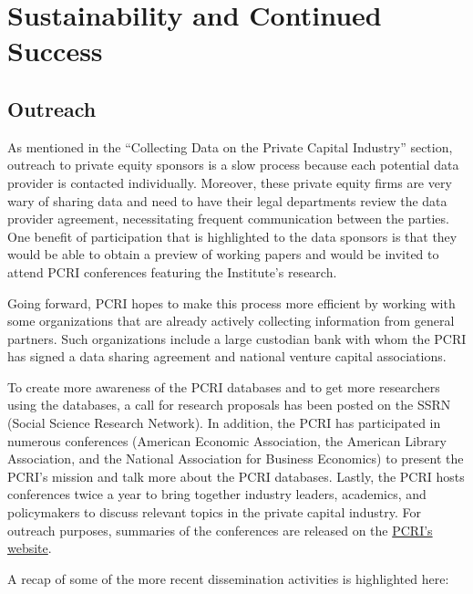 \hypertarget{sustainability-and-continued-success-2}{%
\section{Sustainability and Continued Success}\label{sustainability-and-continued-success-2}}

\hypertarget{outreach-2}{%
\subsection{Outreach}\label{outreach-2}}

As mentioned in the ``Collecting Data on the Private Capital Industry'' section, outreach to private equity sponsors is a slow process because each potential data provider is contacted individually. Moreover, these private equity firms are very wary of sharing data and need to have their legal departments review the data provider agreement, necessitating frequent communication between the parties. One benefit of participation that is highlighted to the data sponsors is that they would be able to obtain a preview of working papers and would be invited to attend PCRI conferences featuring the Institute's research.

Going forward, PCRI hopes to make this process more efficient by working with some organizations that are already actively collecting information from general partners. Such organizations include a large custodian bank with whom the PCRI has signed a data sharing agreement and national venture capital associations.

To create more awareness of the PCRI databases and to get more researchers using the databases, a call for research proposals has been posted on the SSRN (Social Science Research Network). In addition, the PCRI has participated in numerous conferences (American Economic Association, the American Library Association, and the National Association for Business Economics) to present the PCRI's mission and talk more about the PCRI databases. Lastly, the PCRI hosts conferences twice a year to bring together industry leaders, academics, and policymakers to discuss relevant topics in the private capital industry. For outreach purposes, summaries of the conferences are released on the \href{http://www.privatecapitalresearchinstitute.org/}{PCRI's website}.

A recap of some of the more recent dissemination activities is highlighted here:

